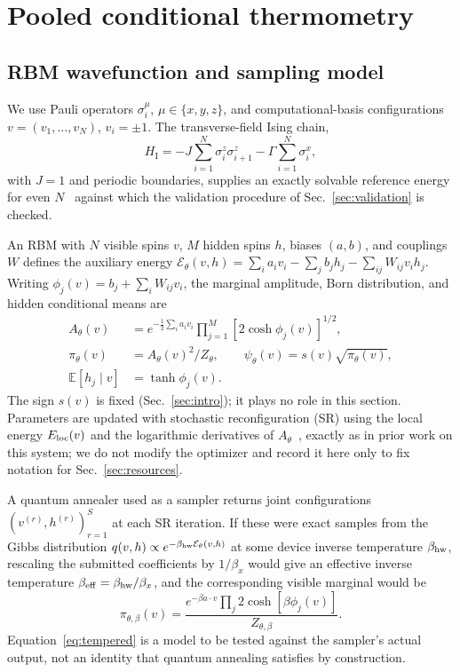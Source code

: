 \section{Pooled conditional thermometry}
\label{sec:thermometry}

\subsection{RBM wavefunction and sampling model}
\label{sec:setup}

We use Pauli operators $\sigma_i^\mu$, $\mu\in\{x,y,z\}$, and computational-basis configurations $v=(v_1,\dots,v_N)$, $v_i=\pm1$. The transverse-field Ising chain,
\begin{equation}
H_{\mathrm I}=-J\sum_{i=1}^N\sigma_i^z\sigma_{i+1}^z-\Gamma\sum_{i=1}^N\sigma_i^x,
\label{eq:ising}
\end{equation}
with $J=1$ and periodic boundaries, supplies an exactly solvable reference energy for even $N$~\cite{Lieb1961,He2017} against which the validation procedure of Sec.~\ref{sec:validation} is checked.

An RBM with $N$ visible spins $v$, $M$ hidden spins $h$, biases $(a,b)$, and couplings $W$ defines the auxiliary energy $\mathcal E_\theta(v,h)=\sum_i a_iv_i-\sum_jb_jh_j-\sum_{ij}W_{ij}v_ih_j$. Writing $\phi_j(v)=b_j+\sum_iW_{ij}v_i$, the marginal amplitude, Born distribution, and hidden conditional means are
\begin{align}
A_\theta(v)&=e^{-\frac12\sum_ia_iv_i}\prod_{j=1}^M[2\cosh\phi_j(v)]^{1/2},\label{eq:amplitude}\\
\pi_\theta(v)&=A_\theta(v)^2/Z_\theta,\qquad \psi_\theta(v)=s(v)\sqrt{\pi_\theta(v)},\label{eq:born}\\
\mathbb E[h_j\mid v]&=\tanh\phi_j(v).\label{eq:condmean}
\end{align}
The sign $s(v)$ is fixed (Sec.~\ref{sec:intro}); it plays no role in this section. Parameters are updated with stochastic reconfiguration (SR) using the local energy $E_{\mathrm{loc}}(v)$ and the logarithmic derivatives of $A_\theta$~\cite{Sorella1998,Sorella2001}, exactly as in prior work on this system; we do not modify the optimizer and record it here only to fix notation for Sec.~\ref{sec:resources}.

A quantum annealer used as a sampler returns joint configurations $(v^{(r)},h^{(r)})_{r=1}^S$ at each SR iteration. If these were exact samples from the Gibbs distribution $q(v,h)\propto e^{-\beta_{\mathrm{hw}}\mathcal E_\theta(v,h)}$ at some device inverse temperature $\beta_{\mathrm{hw}}$, rescaling the submitted coefficients by $1/\beta_x$ would give an effective inverse temperature $\beta_{\mathrm{eff}}=\beta_{\mathrm{hw}}/\beta_x$, and the corresponding visible marginal would be
\begin{equation}
\pi_{\theta,\beta}(v)=\frac{e^{-\beta a\cdot v}\prod_j2\cosh[\beta\phi_j(v)]}{Z_{\theta,\beta}}.
\label{eq:tempered}
\end{equation}
Equation~\eqref{eq:tempered} is a model to be tested against the sampler's actual output, not an identity that quantum annealing satisfies by construction.

